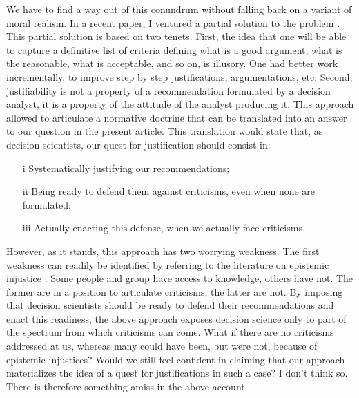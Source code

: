 \documentclass[preprint,11pt]{elsarticle}
\begin{document}
We have to find a way out of this conundrum without falling back on a variant of moral realism. In a recent paper, I ventured a partial solution to the problem \cite{meinard_what_2017}. This partial solution is based on two tenets. First, the idea that one will be able to capture a definitive list of criteria defining what is a good argument, what is the reasonable, what is acceptable, and so on, is illusory. One had better work incrementally, to improve step by step justifications, argumentations, etc. Second, justifiability is not a property of a recommendation formulated by a decision analyst, it is a property of the attitude of the analyst producing it. This approach allowed to articulate a normative doctrine that can be translated into an answer to our question in the present article. This translation would state that, as decision scientists, our quest for justification should consist in:
\begin{itemize}
\item[i]	Systematically justifying our recommendations;
\item[ii]	Being ready to defend them against criticisms, even when none are formulated;
\item[iii]	Actually enacting this defense, when we actually face criticisms.
\end{itemize}
However, as it stands, this approach has two worrying weakness.
The first weakness can readily be identified by referring to the literature on epistemic injustice \cite{fricker_epistemic_2007}. Some people and group have access to knowledge, others have not. The former are in a position to articulate criticisms, the latter are not. By imposing that decision scientists should be ready to defend their recommendations and enact this readiness, the above approach exposes decision science only to part of the spectrum from which criticisms can come. What if there are no criticisms addressed at us, whereas many could have been, but were not, because of epistemic injustices? Would we still feel confident in claiming that our approach materializes the idea of a quest for justifications in such a case? I don’t think so. There is therefore something amiss in the above account.
\end{document}
